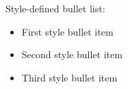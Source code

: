 \documentclass[11pt,a4paper]{article}
\begin{document}
Style-defined bullet list:

\begin{itemize}
\item First style bullet item
\item Second style bullet item
\item Third style bullet item
\end{itemize}
\end{document}
